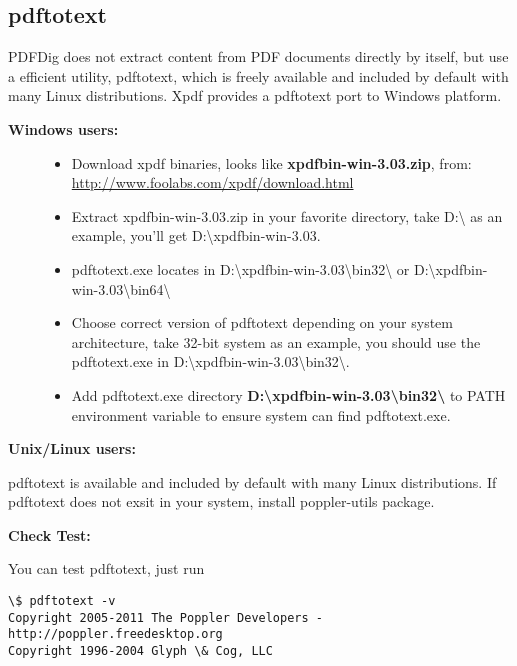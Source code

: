 \documentclass[letterpaper,10pt,oneside]{sphinxmanual}
\begin{document}
\subsection{pdftotext}
\label{tutorial:pdftotext}
PDFDig does not extract content from PDF documents directly by itself, but use a efficient utility, pdftotext, which is freely available and included by default with many Linux distributions. Xpdf provides a pdftotext port to Windows platform.
\begin{description}
\item[{\textbf{Windows users:}}] \leavevmode\begin{itemize}
\item {} 
Download xpdf binaries, looks like \textbf{xpdfbin-win-3.03.zip}, from: \href{http://www.foolabs.com/xpdf/download.html}{http://www.foolabs.com/xpdf/download.html}

\item {} 
Extract xpdfbin-win-3.03.zip in your favorite directory, take D:\textbackslash{} as an example, you'll get D:\textbackslash{}xpdfbin-win-3.03.

\item {} 
pdftotext.exe locates in D:\textbackslash{}xpdfbin-win-3.03\textbackslash{}bin32\textbackslash{} or D:\textbackslash{}xpdfbin-win-3.03\textbackslash{}bin64\textbackslash{}

\item {} 
Choose correct version of pdftotext depending on your system architecture, take 32-bit system as an example, you should use the pdftotext.exe in D:\textbackslash{}xpdfbin-win-3.03\textbackslash{}bin32\textbackslash{}.

\item {} 
Add pdftotext.exe directory \textbf{D:\textbackslash{}xpdfbin-win-3.03\textbackslash{}bin32\textbackslash{}} to PATH environment variable to ensure system can find pdftotext.exe.

\end{itemize}

\end{description}

\textbf{Unix/Linux users:}

pdftotext is available and included by default with many Linux distributions. If pdftotext does not exsit in your system, install poppler-utils package.

\textbf{Check Test:}

You can test pdftotext, just run

\begin{Verbatim}[commandchars=\\\{\}]
\$ pdftotext -v
Copyright 2005-2011 The Poppler Developers - http://poppler.freedesktop.org
Copyright 1996-2004 Glyph \& Cog, LLC
\end{Verbatim}
\end{document}
